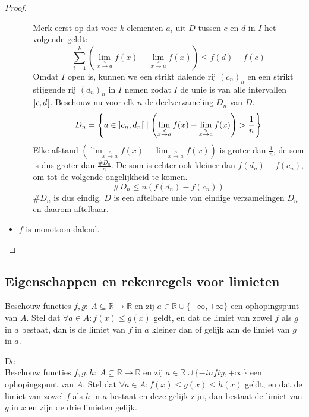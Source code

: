 \documentclass[main.tex]{subfiles}
\begin{document}
\begin{pr}
\begin{proof}
\begin{itemize}
\begin{itemize}
        Merk eerst op dat voor $k$ elementen $a_{i}$ uit $D$ tussen $c$ en $d$ in $I$ het volgende geldt:
        \[ \sum_{i=1}^{k}\left(\lim_{x \overset{<}{\rightarrow} a}f(x)- \lim_{x \overset{>}{\rightarrow} a}f(x)\right) \le f(d) - f(c) \]
        Omdat $I$ open is, kunnen we een strikt dalende rij $(c_{n})_{n}$ en een strikt stijgende rij $(d_{n})_{n}$ in $I$ nemen zodat $I$ de unie is van alle intervallen $\interval[open]{c}{d}$.
        Beschouw nu voor elk $n$ de deelverzameling $D_{n}$ van $D$.
        \[ D_{n} = \left\{ a \in \interval[open]{c_{n}}{d_{n}} \mid \left(\lim_{x \overset{<}{\rightarrow} a}f(x)- \lim_{x \overset{>}{\rightarrow} a}f(x)\right) > \frac{1}{n} \right\} \]
        Elke afstand $\left(\lim_{x \overset{<}{\rightarrow} a}f(x)- \lim_{x \overset{>}{\rightarrow} a}f(x)\right)$ is groter dan $\frac{1}{n}$, de som is dus groter dan $\frac{\#D_{n}}{n}$.
        De som is echter ook kleiner dan $f(d_{n})-f(c_{n})$, om tot de volgende ongelijkheid te komen.
        \[ \#D_{n} \le n(f(d_{n})-f(c_{n})) \]
        $\#D_{n}$ is dus eindig.
        $D$ is een aftelbare unie van eindige verzamelingen $D_{n}$ en daarom aftelbaar.
      \end{itemize}
    \item $f$ is monotoon dalend.\\
    \end{itemize}
  \end{proof}
\end{pr}


\subsection{Eigenschappen en rekenregels voor limieten}
\label{sec:eigensch-en-rekenr}

\begin{pr}
  Beschouw functies $f,g:\ A \subseteq \mathbb{R} \rightarrow \mathbb{R}$ en zij $a\in \mathbb{R} \cup \{-\infty,+\infty\}$ een ophopingspunt van $A$.
  Stel dat $\forall a\in A: f(x) \le g(x)$ geldt, en dat de limiet van zowel $f$ als $g$ in $a$ bestaat, dan is de limiet van $f$ in $a$ kleiner dan of gelijk aan de limiet van $g$ in $a$.\
\end{pr}

\begin{st}
  De \\
  Beschouw functies $f,g,h:\ A \subseteq \mathbb{R} \rightarrow \mathbb{R}$ en zij $a\in \mathbb{R} \cup \{-infty,+\infty\}$ een ophopingspunt van $A$.
  Stel dat $\forall a\in A: f(x) \le g(x) \le h(x)$ geldt, en dat de limiet van zowel $f$ als $h$ in $a$ bestaat en deze gelijk zijn, dan bestaat de limiet van $g$ in $x$ en zijn de drie limieten gelijk.
\extra{bewijs}
\end{st}
\end{document}
